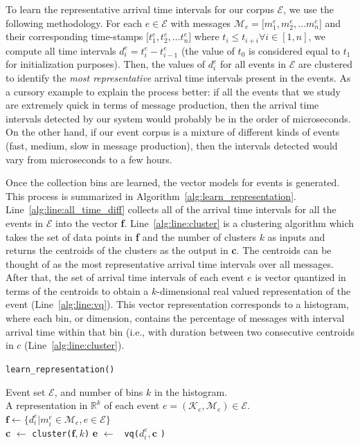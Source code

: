 \documentclass[10pt,letterpaper]{article}
\begin{document}
To learn the representative arrival time intervals for our corpus
$\mathcal{E}$, we use the following methodology. For each $e \in
\mathcal{E}$ with messages $\mathcal{M}_e = \lbrack m_{1}^e, m_{2}^e,
\ldots m_{n}^e \rbrack$ and their corresponding time-stamps $\lbrack
t_{1}^e, t_{2}^e, \ldots t_{n}^e \rbrack$ where $t_{i} \leq t_{i+i}
\forall i \in [1,n]$, we compute all time intervals $d_{i}^e =
t_{i}^e-t_{i-1}^e$ (the value of $t_{0}$ is considered equal to
$t_{1}$ for initialization purposes). Then, the values of $d_{i}^e$
for all events in $\mathcal{E}$ are clustered to identify the {\em
  most representative} arrival time intervals present in the events.
As a cursory example to explain the process better: if all the events
that we study are extremely quick in terms of message production, then
the arrival time intervals detected by our system would probably be in
the order of microseconds. On the other hand, if our event corpus is a
mixture of different kinds of events (fast, medium, slow in message
production), then the intervals detected would vary from microseconds
to a few hours.

Once the collection bins are learned, the vector models for events is
generated. This process is summarized in
Algorithm~\ref{alg:learn_representation}.
Line~\ref{alg:line:all_time_diff} collects all of the arrival time
intervals for all the events in $\mathcal{E}$ into the vector
\textbf{f}. Line~\ref{alg:line:cluster} is a clustering algorithm
which takes the set of data points in \textbf{f} and the number of
clusters $k$ as inputs and returns the centroids of the clusters as
the output in \textbf{c}. The centroids can be thought of as the most
representative arrival time intervals over all messages. After that,
the set of arrival time intervals of each event $e$ is vector
quantized in terms of the centroids to obtain a $k$-dimensional real
valued representation of the event (Line~\ref{alg:line:vq}). This
vector representation corresponds to a histogram, where each bin, or
dimension, contains the percentage of messages with interval arrival
time within that bin (i.e., with duration between two consecutive
centroids in $c$ (Line~\ref{alg:line:cluster}).

\begin{algorithm}
  \caption{{\tt learn\_representation()}}
  \label{alg:learn_representation}
  \begin{algorithmic}[1]
    \REQUIRE Event set $\mathcal{E}$, and number of bins $k$ in the histogram.\\
    \ENSURE A representation in $\mathbb{R}^{k}$ of each event $e = (\mathcal{K}_e, \mathcal{M}_e) \in \mathcal{E}$.\\
    \STATE $\textbf{f} \leftarrow \{d_{i}^e| m_{i}^e \in
    \mathcal{M}_e, e \in \mathcal{E} \}$
    \\ \label{alg:line:all_time_diff} \STATE \textbf{c} $\leftarrow$
    {\tt cluster(}$\textbf{f}, k${\tt)} \label{alg:line:cluster}
     \STATE \textbf{e} $\leftarrow$ {\tt
      vq(}$d_{i}^e, \textbf{c}$ {\tt)}\\ \label{alg:line:vq}
    \ENDFOR
  \end{algorithmic}
\end{algorithm}
\end{document}
